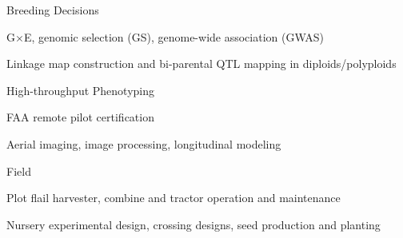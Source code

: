 \documentclass[10pt]{article}
\newcommand{\halfblankline}{\quad\vspace{-0.5\baselineskip}\pagebreak[3]}
\begin{document}

\halfblankline

Breeding Decisions
%
\begin{innerlist}
    \item G$\times$E, genomic selection (GS), genome-wide association (GWAS)
	\item Linkage map construction and bi-parental QTL mapping in diploids/polyploids
\end{innerlist}

\halfblankline 

High-throughput Phenotyping
\begin{innerlist}
\item FAA remote pilot certification
\item Aerial imaging, image processing, longitudinal modeling 
\end{innerlist}

\halfblankline

Field
%
\begin{innerlist}
\item Plot flail harvester, combine and tractor operation and maintenance
\item Nursery experimental design, crossing designs, seed production and planting 
\end{innerlist}
\end{document}
